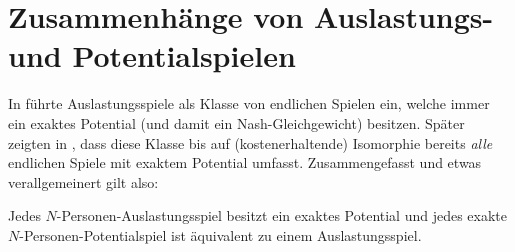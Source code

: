 \section{Zusammenhänge von Auslastungs- und Potentialspielen}\label{sec:Auslastungsspiele}


In \cite{RosenthalPotential} führte \citeauthor{RosenthalPotential} Auslastungsspiele als Klasse von endlichen Spielen ein, welche immer ein exaktes Potential (und damit ein Nash-Gleichgewicht) besitzen. Später zeigten \citeauthor{MonShap} in \cite[Theorem 3.2]{MonShap}, dass diese Klasse bis auf (kostenerhaltende) Isomorphie bereits \emph{alle} endlichen Spiele mit exaktem Potential umfasst. Zusammengefasst und etwas verallgemeinert gilt also:

\begin{satz}\label{satz:MondererShapley}
	Jedes $N$-Personen-Auslastungsspiel besitzt ein exaktes Potential und jedes exakte $N$-Personen-Potentialspiel ist äquivalent zu einem Auslastungsspiel.
\end{satz}

